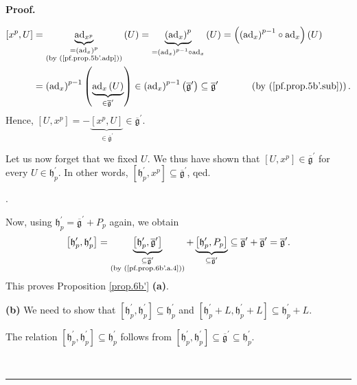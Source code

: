\documentclass[numbers=enddot,12pt,final,onecolumn,notitlepage]{scrartcl}%
\theoremstyle{definition}
\newenvironment{proof}[1][Proof]{\noindent\textbf{#1.} }{\ \rule{0.5em}{0.5em}}
\begin{document}
\begin{proof}
{\begin{align*}
\left[  x^{p},U\right]   &  =\underbrace{\operatorname*{ad}\nolimits_{x^{p}}%
}_{\substack{=\left(  \operatorname*{ad}\nolimits_{x}\right)  ^{p}\\\text{(by
(\ref{pf.prop.5b'.adp}))}}}\left(  U\right)  =\underbrace{\left(
\operatorname*{ad}\nolimits_{x}\right)  ^{p}}_{=\left(  \operatorname*{ad}%
\nolimits_{x}\right)  ^{p-1}\circ\operatorname*{ad}\nolimits_{x}}\left(
U\right)  =\left(  \left(  \operatorname*{ad}\nolimits_{x}\right)  ^{p-1}%
\circ\operatorname*{ad}\nolimits_{x}\right)  \left(  U\right) \\
&  =\left(  \operatorname*{ad}\nolimits_{x}\right)  ^{p-1}\left(
\underbrace{\operatorname*{ad}\nolimits_{x}\left(  U\right)  }_{\in
\overline{\mathfrak{g}}^{\prime}}\right)  \in\left(  \operatorname*{ad}%
\nolimits_{x}\right)  ^{p-1}\left(  \overline{\mathfrak{g}}^{\prime}\right)
\subseteq\overline{\mathfrak{g}}^{\prime}\ \ \ \ \ \ \ \ \ \ \left(  \text{by
(\ref{pf.prop.5b'.sub})}\right)  .
\end{align*}
Hence, $\left[  U,x^{p}\right]  =-\underbrace{\left[  x^{p},U\right]  }%
_{\in\overline{\mathfrak{g}}^{\prime}}\in\overline{\mathfrak{g}}^{\prime}$.
\par
Let us now forget that we fixed $U$. We thus have shown that $\left[
U,x^{p}\right]  \in\overline{\mathfrak{g}}^{\prime}$ for every $U\in
\mathfrak{h}_{p}^{\prime}$. In other words, $\left[  \mathfrak{h}_{p}^{\prime
},x^{p}\right]  \subseteq\overline{\mathfrak{g}}^{\prime}$, qed.}.

Now, using $\mathfrak{h}_{p}^{\prime}=\overline{\mathfrak{g}}^{\prime}+P_{p}$
again, we obtain%
\[
\left[  \mathfrak{h}_{p}^{\prime},\mathfrak{h}_{p}^{\prime}\right]
=\underbrace{\left[  \mathfrak{h}_{p}^{\prime},\overline{\mathfrak{g}}%
^{\prime}\right]  }_{\substack{\subseteq\overline{\mathfrak{g}}^{\prime
}\\\text{(by (\ref{pf.prop.6b'.a.4}))}}}+\underbrace{\left[  \mathfrak{h}%
_{p}^{\prime},P_{p}\right]  }_{\subseteq\overline{\mathfrak{g}}^{\prime}%
}\subseteq\overline{\mathfrak{g}}^{\prime}+\overline{\mathfrak{g}}^{\prime
}=\overline{\mathfrak{g}}^{\prime}.
\]
This proves Proposition \ref{prop.6b'} \textbf{(a)}. \medskip

\textbf{(b)} We need to show that $\left[  \mathfrak{h}_{p}^{\prime
},\mathfrak{h}_{p}^{\prime}\right]  \subseteq\mathfrak{h}_{p}^{\prime}$ and
$\left[  \mathfrak{h}_{p}^{\prime}+L,\mathfrak{h}_{p}^{\prime}+L\right]
\subseteq\mathfrak{h}_{p}^{\prime}+L$.

The relation $\left[  \mathfrak{h}_{p}^{\prime},\mathfrak{h}_{p}^{\prime
}\right]  \subseteq\mathfrak{h}_{p}^{\prime}$ follows from $\left[
\mathfrak{h}_{p}^{\prime},\mathfrak{h}_{p}^{\prime}\right]  \subseteq
\overline{\mathfrak{g}}^{\prime}\subseteq\mathfrak{h}_{p}^{\prime}$.


\end{proof}
\end{document}
